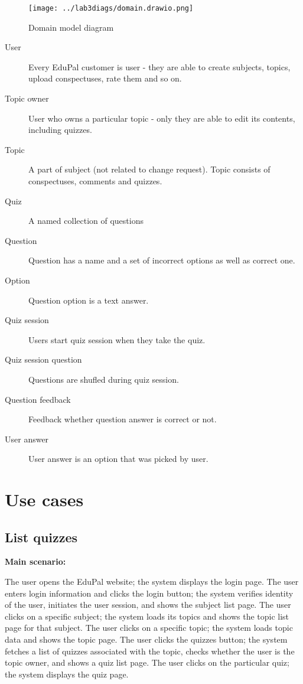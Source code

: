 \documentclass[
    english, %
]{VUMIFPSkursinis}
\begin{document}
\begin{figure}[ht]
    \centering
    \texttt{[image: ../lab3diags/domain.drawio.png]}
    \caption{Domain model diagram}
    \label{domain-model}
\end{figure}

\begin{description}
    \item[User] Every EduPal customer is user - they are able to create subjects, topics, upload conspectuses, rate them and so on.
    \item[Topic owner] User who owns a particular topic - only they are able to edit its contents, including quizzes.
    \item[Topic] A part of subject (not related to change request). Topic consists of conspectuses, comments and quizzes.
    \item[Quiz] A named collection of questions
    \item[Question] Question has a name and a set of incorrect options as well as correct one.
    \item[Option] Question option is a text answer.
    \item[Quiz session] Users start quiz session when they take the quiz.
    \item[Quiz session question] Questions are shufled during quiz session.
    \item[Question feedback] Feedback whether question answer is correct or not.
    \item[User answer] User answer is an option that was picked by user.
\end{description}

\section{Use cases}

\subsection{List quizzes}

\noindent\textbf{\fontsize{13}{15}\selectfont Main scenario:}

The user opens the EduPal website; the system displays the login page. The user enters login information and clicks the login button; the system verifies identity of the user, initiates the user session, and shows the subject list page. The user clicks on a specific subject; the system loads its topics and shows the topic list page for that subject. The user clicks on a specific topic; the system loads topic data and shows the topic page. The user clicks the quizzes button; the system fetches a list of quizzes associated with the topic, checks whether the user is the topic owner, and shows a quiz list page. The user clicks on the particular quiz; the system displays the quiz page.
\end{document}
